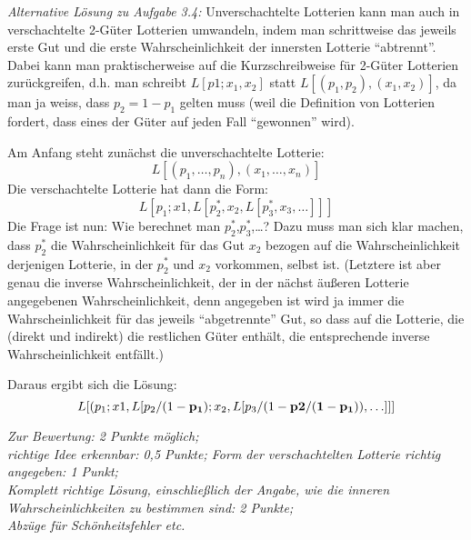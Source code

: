 \documentclass[10pt, a4paper, german]{article}
\numberwithin {equation}{section}
\begin{document}
\vspace{0.5cm}

{\em Alternative Lösung zu Aufgabe 3.4:}
Unverschachtelte Lotterien kann man auch in verschachtelte 2-Güter Lotterien
umwandeln, indem man schrittweise das jeweils erste Gut und die erste
Wahrscheinlichkeit der innersten Lotterie ``abtrennt''. Dabei kann man
praktischerweise auf die Kurzschreibweise für 2-Güter Lotterien zurückgreifen,
d.h. man schreibt $L[p1; x_1, x_2]$ statt $L[(p_1, p_2), (x_1, x_2)]$, da man
ja weiss, dass $p_2 = 1-p_1$ gelten muss (weil die Definition von Lotterien
fordert, dass eines der Güter auf jeden Fall ``gewonnen'' wird).

Am Anfang steht zunächst die unverschachtelte Lotterie:
\[
L[(p_1,\ldots, p_n),(x_1,\ldots, x_n)]
\]
Die verschachtelte Lotterie hat dann die Form:
\[
L[p_1; x1, L[p^*_2, x_2, L[p^*_3, x_3, \ldots]]]
\]
Die Frage ist nun: Wie berechnet man $p^*_2$,$p^*_3$,\ldots ? 
Dazu muss man sich klar machen, dass $p^*_2$ die Wahrscheinlichkeit für das Gut
$x_2$ bezogen auf die Wahrscheinlichkeit derjenigen Lotterie, in der
$p^*_2$ und $x_2$ vorkommen, selbst ist. (Letztere ist aber genau die inverse
Wahrscheinlichkeit, der in der nächst äußeren Lotterie angegebenen
Wahrscheinlichkeit, denn angegeben ist wird ja immer die Wahrscheinlichkeit für
das jeweils ``abgetrennte'' Gut, so dass auf die Lotterie, die (direkt und
indirekt) die restlichen Güter enthält, die entsprechende inverse
Wahrscheinlichkeit entfällt.)

Daraus ergibt sich die Lösung:
\[
L[(p_1; x1, L[p_2/(1-{\bf p_1}); x_2, L[p_3/(1-{\bf p2/(1-p_1))}, \ldots]]]
\]

\vspace{0.25cm}

{\em Zur Bewertung: 2 Punkte möglich;\\ richtige Idee erkennbar: 0,5 Punkte;
Form der verschachtelten Lotterie richtig angegeben: 1 Punkt;\\ Komplett
richtige Lösung, einschließlich der Angabe, wie die inneren
Wahrscheinlichkeiten zu bestimmen sind: 2 Punkte;\\ Abzüge für Schönheitsfehler
etc.}
\end{document}
